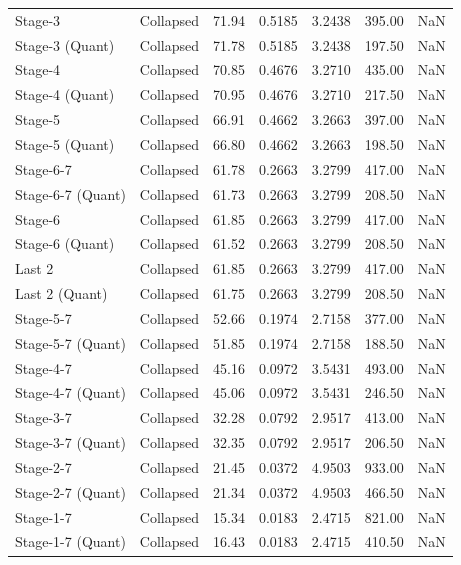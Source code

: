 \begin{table}
\begin{tabular}{llrrrrl}
Stage-3 & Collapsed & 71.94 & 0.5185 & 3.2438 & 395.00 & NaN \\
Stage-3
(Quant) & Collapsed & 71.78 & 0.5185 & 3.2438 & 197.50 & NaN \\
Stage-4 & Collapsed & 70.85 & 0.4676 & 3.2710 & 435.00 & NaN \\
Stage-4
(Quant) & Collapsed & 70.95 & 0.4676 & 3.2710 & 217.50 & NaN \\
Stage-5 & Collapsed & 66.91 & 0.4662 & 3.2663 & 397.00 & NaN \\
Stage-5
(Quant) & Collapsed & 66.80 & 0.4662 & 3.2663 & 198.50 & NaN \\
Stage-6-7 & Collapsed & 61.78 & 0.2663 & 3.2799 & 417.00 & NaN \\
Stage-6-7
(Quant) & Collapsed & 61.73 & 0.2663 & 3.2799 & 208.50 & NaN \\
Stage-6 & Collapsed & 61.85 & 0.2663 & 3.2799 & 417.00 & NaN \\
Stage-6
(Quant) & Collapsed & 61.52 & 0.2663 & 3.2799 & 208.50 & NaN \\
Last 2 & Collapsed & 61.85 & 0.2663 & 3.2799 & 417.00 & NaN \\
Last 2
(Quant) & Collapsed & 61.75 & 0.2663 & 3.2799 & 208.50 & NaN \\
Stage-5-7 & Collapsed & 52.66 & 0.1974 & 2.7158 & 377.00 & NaN \\
Stage-5-7
(Quant) & Collapsed & 51.85 & 0.1974 & 2.7158 & 188.50 & NaN \\
Stage-4-7 & Collapsed & 45.16 & 0.0972 & 3.5431 & 493.00 & NaN \\
Stage-4-7
(Quant) & Collapsed & 45.06 & 0.0972 & 3.5431 & 246.50 & NaN \\
Stage-3-7 & Collapsed & 32.28 & 0.0792 & 2.9517 & 413.00 & NaN \\
Stage-3-7
(Quant) & Collapsed & 32.35 & 0.0792 & 2.9517 & 206.50 & NaN \\
Stage-2-7 & Collapsed & 21.45 & 0.0372 & 4.9503 & 933.00 & NaN \\
Stage-2-7
(Quant) & Collapsed & 21.34 & 0.0372 & 4.9503 & 466.50 & NaN \\
Stage-1-7 & Collapsed & 15.34 & 0.0183 & 2.4715 & 821.00 & NaN \\
Stage-1-7
(Quant) & Collapsed & 16.43 & 0.0183 & 2.4715 & 410.50 & NaN \\
\bottomrule
\end{tabular}
\end{table}
